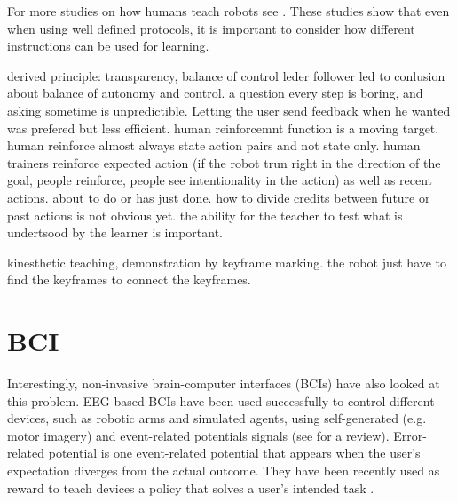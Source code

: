 For more studies on how humans teach robots see \cite{thomaz2009learning,kaochar2011towards,knox2012humans}. These studies show that even when using well defined protocols, it is important to consider how different instructions can be used for learning. 



derived principle: \cite{thomaz2008teachable} 
transparency, balance of control leder follower
\cite{cakmak2010designing} led to conlusion about balance of autonomy and control. a question every step is boring,  and asking sometime is unpredictible. Letting the user send feedback when he wanted was prefered but less efficient.
\cite{knox2009design} human reinforcemnt function is a moving target. human reinforce almost always state action pairs and not state only. human trainers reinforce expected action (if the robot trun right in the direction of the goal, people reinforce, people see intentionality in the action) as well as recent actions. about to do or has just done. how to divide credits between future or past actions is not obvious yet.
\cite{kaochar2011towards} the ability for the teacher to test what is undertsood by the learner is important.



\cite{akgun12hri} kinesthetic teaching, demonstration by keyframe marking. the robot just have to find the keyframes to connect the keyframes.

\section{BCI}

Interestingly, non-invasive brain-computer interfaces (BCIs) have also looked at this problem. EEG-based BCIs have been used successfully to control different devices, such as robotic arms and simulated agents, using self-generated (e.g. motor imagery) and event-related potentials signals (see \cite{millan10} for a review). 
%
Error-related potential is one event-related potential that appears when the user's expectation diverges from the actual outcome. They have been recently used as reward to teach devices a policy that solves a user's intended task \cite{chavarriaga2010learning,iturrate2010robot}.

